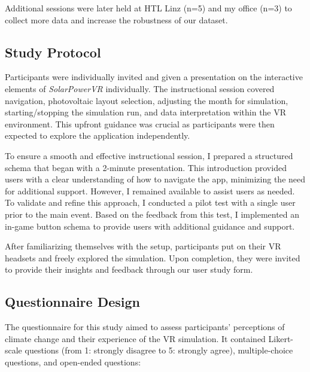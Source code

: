 \documentclass[draft, final]{vutinfth} %
\begin{document}
Additional sessions were later held at HTL Linz (n=5) and my office (n=3) to collect more data and increase the robustness of our dataset.

\subsection{Study Protocol}
Participants were individually invited and given a presentation on the interactive elements of \textit{SolarPowerVR} individually. The instructional session covered navigation, photovoltaic layout selection, adjusting the month for simulation, starting/stopping the simulation run, and data interpretation within the VR environment. This upfront guidance was crucial as participants were then expected to explore the application independently.

To ensure a smooth and effective instructional session, I prepared a structured schema that began with a 2-minute presentation. This introduction provided users with a clear understanding of how to navigate the app, minimizing the need for additional support. However, I remained available to assist users as needed. To validate and refine this approach, I conducted a pilot test with a single user prior to the main event. Based on the feedback from this test, I implemented an in-game button schema to provide users with additional guidance and support.

After familiarizing themselves with the setup, participants put on their VR headsets and freely explored the simulation. Upon completion, they were invited to provide their insights and feedback through our user study form.

\subsection{Questionnaire Design}

The questionnaire for this study aimed to assess participants' perceptions of climate change and their experience of the VR simulation. It contained Likert-scale questions (from 1: strongly disagree to 5: strongly agree), multiple-choice questions, and open-ended questions:
\end{document}
